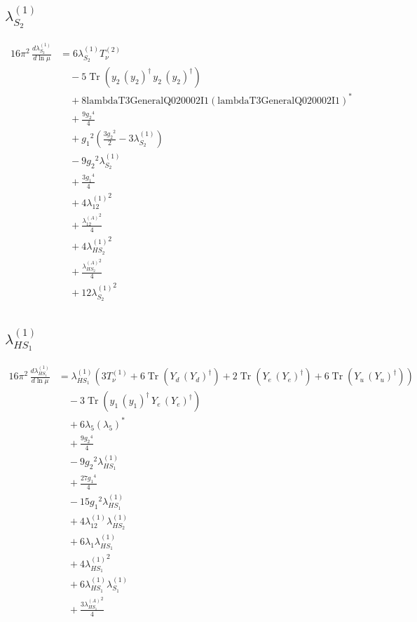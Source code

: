 \documentclass[10pt,a4paper]{article}
\begin{document}
\subsection*{$\lambda_{S_2}^{(1)}$}
\begin{align*}
16\pi^2\,\frac{d \lambda_{S_2}^{(1)}}{d\ln\mu} &=6 {\lambda_{S_2}^{(1)}} T_{\nu}^{(2)} \\
&\quad -5 \operatorname{Tr}\!\left({y_2}\,\left({y_2}\right)^{\dagger}\,{y_2}\,\left({y_2}\right)^{\dagger}\right) \\
&\quad +8 \text{lambdaT3GeneralQ020002I1} \left(\text{lambdaT3GeneralQ020002I1}\right)^{*} \\
&\quad +\frac{9 {g_2}^4}{4} \\
&\quad +{g_1}^2 \left(\frac{3 {g_2}^2}{2}-3 {\lambda_{S_2}^{(1)}}\right) \\
&\quad -9 {g_2}^2 {\lambda_{S_2}^{(1)}} \\
&\quad +\frac{3 {g_1}^4}{4} \\
&\quad +4 {\lambda_{12}^{(1)}}^2 \\
&\quad +\frac{{\lambda_{12}^{(A)}}^2}{4} \\
&\quad +4 {\lambda_{HS_2}^{(1)}}^2 \\
&\quad +\frac{{\lambda_{HS_2}^{(A)}}^2}{4} \\
&\quad +12 {\lambda_{S_2}^{(1)}}^2 \\
\end{align*}
\subsection*{$\lambda_{HS_1}^{(1)}$}
\begin{align*}
16\pi^2\,\frac{d \lambda_{HS_1}^{(1)}}{d\ln\mu} &={\lambda_{HS_1}^{(1)}} (3 T_{\nu}^{(1)}+6 \operatorname{Tr}\!\left({Y_d}\,\left({Y_d}\right)^{\dagger}\right)+2 \operatorname{Tr}\!\left({Y_e}\,\left({Y_e}\right)^{\dagger}\right)+6 \operatorname{Tr}\!\left({Y_u}\,\left({Y_u}\right)^{\dagger}\right)) \\
&\quad -3 \operatorname{Tr}\!\left({y_1}\,\left({y_1}\right)^{\dagger}\,{Y_e}\,\left({Y_e}\right)^{\dagger}\right) \\
&\quad +6 {\lambda_5} \left({\lambda_5}\right)^{*} \\
&\quad +\frac{9 {g_2}^4}{4} \\
&\quad -9 {g_2}^2 {\lambda_{HS_1}^{(1)}} \\
&\quad +\frac{27 {g_1}^4}{4} \\
&\quad -15 {g_1}^2 {\lambda_{HS_1}^{(1)}} \\
&\quad +4 {\lambda_{12}^{(1)}} {\lambda_{HS_2}^{(1)}} \\
&\quad +6 {\lambda_1} {\lambda_{HS_1}^{(1)}} \\
&\quad +4 {\lambda_{HS_1}^{(1)}}^2 \\
&\quad +6 {\lambda_{HS_1}^{(1)}} {\lambda_{S_1}^{(1)}} \\
&\quad +\frac{3 {\lambda_{HS_1}^{(A)}}^2}{4} \\
\end{align*}
\end{document}
